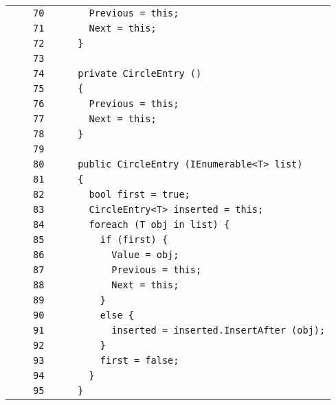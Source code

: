 \documentclass[a4paper,10pt]{article}
\begin{document}
\begin{longtable}[l]{lrrl}
\cellcolor{gray} &  & \verb~70~ & \verb~      Previous = this;~\\
\cellcolor{gray} &  & \verb~71~ & \verb~      Next = this;~\\
\cellcolor{gray} &  & \verb~72~ & \verb~    }~\\
\cellcolor{gray} &  & \verb~73~ & \verb~~\\
\cellcolor{gray} &  & \verb~74~ & \verb~    private CircleEntry ()~\\
\cellcolor{gray} &  & \verb~75~ & \verb~    {~\\
\cellcolor{gray} &  & \verb~76~ & \verb~      Previous = this;~\\
\cellcolor{gray} &  & \verb~77~ & \verb~      Next = this;~\\
\cellcolor{gray} &  & \verb~78~ & \verb~    }~\\
\cellcolor{gray} &  & \verb~79~ & \verb~~\\
\cellcolor{gray} &  & \verb~80~ & \verb~    public CircleEntry (IEnumerable<T> list)~\\
\cellcolor{gray} &  & \verb~81~ & \verb~    {~\\
\cellcolor{gray} &  & \verb~82~ & \verb~      bool first = true;~\\
\cellcolor{gray} &  & \verb~83~ & \verb~      CircleEntry<T> inserted = this;~\\
\cellcolor{gray} &  & \verb~84~ & \verb~      foreach (T obj in list) {~\\
\cellcolor{gray} &  & \verb~85~ & \verb~        if (first) {~\\
\cellcolor{gray} &  & \verb~86~ & \verb~          Value = obj;~\\
\cellcolor{gray} &  & \verb~87~ & \verb~          Previous = this;~\\
\cellcolor{gray} &  & \verb~88~ & \verb~          Next = this;~\\
\cellcolor{gray} &  & \verb~89~ & \verb~        }~\\
\cellcolor{gray} &  & \verb~90~ & \verb~        else {~\\
\cellcolor{gray} &  & \verb~91~ & \verb~          inserted = inserted.InsertAfter (obj);~\\
\cellcolor{gray} &  & \verb~92~ & \verb~        }~\\
\cellcolor{gray} &  & \verb~93~ & \verb~        first = false;~\\
\cellcolor{gray} &  & \verb~94~ & \verb~      }~\\
\cellcolor{gray} &  & \verb~95~ & \verb~    }~\\

\end{longtable}
\end{document}
